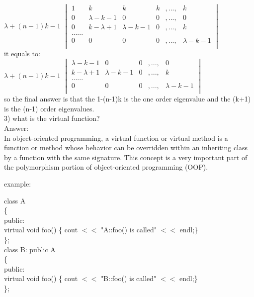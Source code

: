 \documentclass[12pt]{article}
\theoremstyle{plain}
\begin{document}
$\lambda+(n-1)k-1$
$\begin{vmatrix}
 1 &k&k&k&,...,&k \\
 0 &\lambda-k-1&0&0&,...,&0\\
 0 &k-\lambda+1&\lambda-k-1&0&,...,&k\\
 ......\\
 0 &0&0&0&,...,&\lambda-k-1\\
\end{vmatrix}$ \\

it equals to:\\
$\lambda+(n-1)k-1$
$\begin{vmatrix}
 \lambda-k-1&0&0&,...,&0\\
 k-\lambda+1&\lambda-k-1&0&,...,&k\\
 ......\\
 0&0&0&,...,&\lambda-k-1\\
\end{vmatrix}$ \\
so the final answer is that the 1-(n-1)k is the one order eigenvalue and the (k+1) is the (n-1) order eigenvalues.\\
\vfill
3) what is the virtual function?\\
Answer:\\
In object-oriented programming, a virtual function or virtual method is a function or method whose behavior can be overridden within an inheriting class by a function with the same signature. This concept is a very important part of the polymorphism portion of object-oriented programming (OOP).

example:

class A\\
 \{\\
 public:\\
     virtual void foo() \{ cout $<<$ "A::foo() is called" $<<$ endl;\}\\
 \};\\

class B: public A\\
 \{\\
 public:\\
     virtual void foo() \{ cout $<<$ "B::foo() is called" $<<$ endl;\}\\
 \};\\
\end{document}
